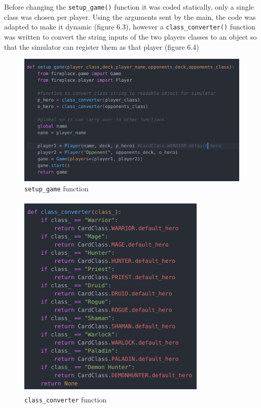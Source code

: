 \documentclass{report} %
\begin{document}
Before changing the \nolinkurl{setup_game()} function it was coded statically, only a single class was chosen per player. Using the arguments sent by the main, the code was adapted to make it dynamic (figure 6.3), however a \nolinkurl{class_converter()} function was written to convert the string inputs of the two players classes to an object so that the simulator can register them as that player (figure 6.4)

\begin{figure}[H]
\centering
\includegraphics[width=1\textwidth]{setupGame}
\caption{\nolinkurl{setup_game} function \protect}
 \label{board}
\end{figure}

\begin{figure}[H]
\centering
\includegraphics[width=9cm, height=10cm]{classConverter}
\caption{\nolinkurl{class_converter} function \protect}
 \label{board}
\end{figure}
\end{document}
